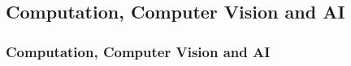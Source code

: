 \subsection*{Computation, Computer Vision and AI}
\begin{frame}[t]
    \frametitle{Computation, Computer Vision and AI}
    \cite{mythos_interp}
\end{frame}